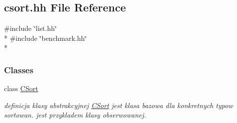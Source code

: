 \hypertarget{csort_8hh}{}\subsection{csort.\+hh File Reference}
\label{csort_8hh}
{\ttfamily \#include \char`\"{}list.\+hh\char`\"{}}\\*
{\ttfamily \#include \char`\"{}benchmark.\+hh\char`\"{}}\\*
\subsubsection*{Classes}
\begin{DoxyCompactItemize}
\item 
class \hyperlink{class_c_sort}{C\+Sort}
\begin{DoxyCompactList}\small\item\em definicja klasy abstrakcyjnej \hyperlink{class_c_sort}{C\+Sort} jest klasa bazowa dla konkretnych typow sortowan. jest przykladem klasy obserwowanej. \end{DoxyCompactList}\end{DoxyCompactItemize}
